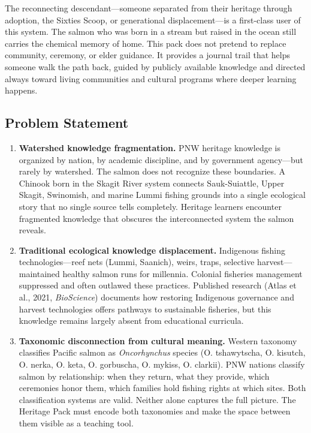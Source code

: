 \documentclass[11pt,letterpaper]{article}
\begin{document}
The reconnecting descendant---someone separated from their heritage through adoption, the Sixties Scoop, or generational displacement---is a first-class user of this system. The salmon who was born in a stream but raised in the ocean still carries the chemical memory of home. This pack does not pretend to replace community, ceremony, or elder guidance. It provides a journal trail that helps someone walk the path back, guided by publicly available knowledge and directed always toward living communities and cultural programs where deeper learning happens.

\subsection{Problem Statement}

\begin{enumerate}[leftmargin=2em]
\item \textbf{Watershed knowledge fragmentation.} PNW heritage knowledge is organized by nation, by academic discipline, and by government agency---but rarely by watershed. The salmon does not recognize these boundaries. A Chinook born in the Skagit River system connects Sauk-Suiattle, Upper Skagit, Swinomish, and marine Lummi fishing grounds into a single ecological story that no single source tells completely. Heritage learners encounter fragmented knowledge that obscures the interconnected system the salmon reveals.

\item \textbf{Traditional ecological knowledge displacement.} Indigenous fishing technologies---reef nets (Lummi, Saanich), weirs, traps, selective harvest---maintained healthy salmon runs for millennia. Colonial fisheries management suppressed and often outlawed these practices. Published research (Atlas et al., 2021, \textit{BioScience}) documents how restoring Indigenous governance and harvest technologies offers pathways to sustainable fisheries, but this knowledge remains largely absent from educational curricula.

\item \textbf{Taxonomic disconnection from cultural meaning.} Western taxonomy classifies Pacific salmon as \textit{Oncorhynchus} species (O. tshawytscha, O. kisutch, O. nerka, O. keta, O. gorbuscha, O. mykiss, O. clarkii). PNW nations classify salmon by relationship: when they return, what they provide, which ceremonies honor them, which families hold fishing rights at which sites. Both classification systems are valid. Neither alone captures the full picture. The Heritage Pack must encode both taxonomies and make the space between them visible as a teaching tool.


\end{enumerate}
\end{document}
